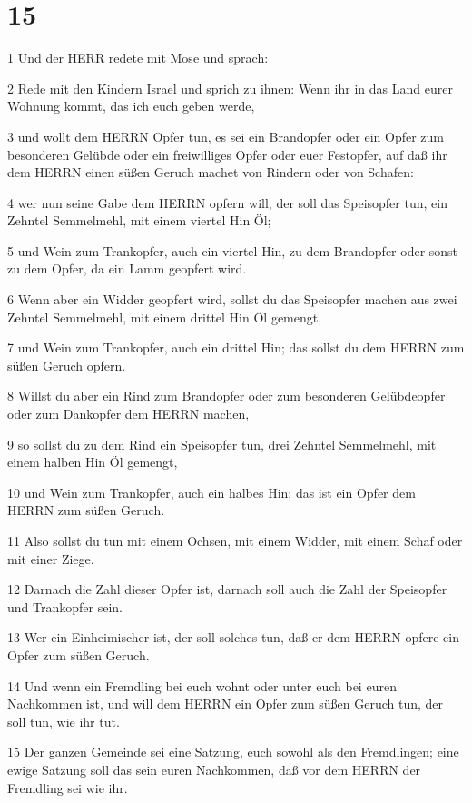 \chapter{15}

\par 1 Und der HERR redete mit Mose und sprach:
\par 2 Rede mit den Kindern Israel und sprich zu ihnen: Wenn ihr in das Land eurer Wohnung kommt, das ich euch geben werde,
\par 3 und wollt dem HERRN Opfer tun, es sei ein Brandopfer oder ein Opfer zum besonderen Gelübde oder ein freiwilliges Opfer oder euer Festopfer, auf daß ihr dem HERRN einen süßen Geruch machet von Rindern oder von Schafen:
\par 4 wer nun seine Gabe dem HERRN opfern will, der soll das Speisopfer tun, ein Zehntel Semmelmehl, mit einem viertel Hin Öl;
\par 5 und Wein zum Trankopfer, auch ein viertel Hin, zu dem Brandopfer oder sonst zu dem Opfer, da ein Lamm geopfert wird.
\par 6 Wenn aber ein Widder geopfert wird, sollst du das Speisopfer machen aus zwei Zehntel Semmelmehl, mit einem drittel Hin Öl gemengt,
\par 7 und Wein zum Trankopfer, auch ein drittel Hin; das sollst du dem HERRN zum süßen Geruch opfern.
\par 8 Willst du aber ein Rind zum Brandopfer oder zum besonderen Gelübdeopfer oder zum Dankopfer dem HERRN machen,
\par 9 so sollst du zu dem Rind ein Speisopfer tun, drei Zehntel Semmelmehl, mit einem halben Hin Öl gemengt,
\par 10 und Wein zum Trankopfer, auch ein halbes Hin; das ist ein Opfer dem HERRN zum süßen Geruch.
\par 11 Also sollst du tun mit einem Ochsen, mit einem Widder, mit einem Schaf oder mit einer Ziege.
\par 12 Darnach die Zahl dieser Opfer ist, darnach soll auch die Zahl der Speisopfer und Trankopfer sein.
\par 13 Wer ein Einheimischer ist, der soll solches tun, daß er dem HERRN opfere ein Opfer zum süßen Geruch.
\par 14 Und wenn ein Fremdling bei euch wohnt oder unter euch bei euren Nachkommen ist, und will dem HERRN ein Opfer zum süßen Geruch tun, der soll tun, wie ihr tut.
\par 15 Der ganzen Gemeinde sei eine Satzung, euch sowohl als den Fremdlingen; eine ewige Satzung soll das sein euren Nachkommen, daß vor dem HERRN der Fremdling sei wie ihr.
